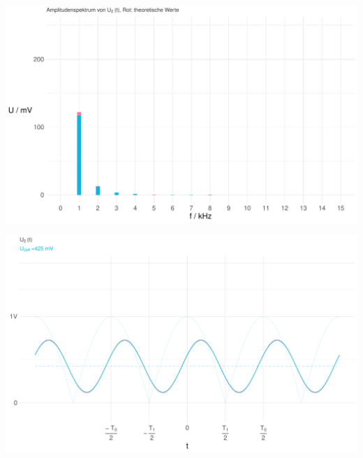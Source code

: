 \documentclass[a4paper, 12pt]{article}
\begin{document}
  \begin{center}
    \includegraphics[scale=0.5]{./R/3_3/3_3_ASpektrum.pdf}
  \end{center}
  \vspace{0.021276873\paperheight}
  \begin{center}
    \includegraphics[scale=0.5]{./R/3_3/3_3_function.pdf}
  \end{center}
\end{document}
